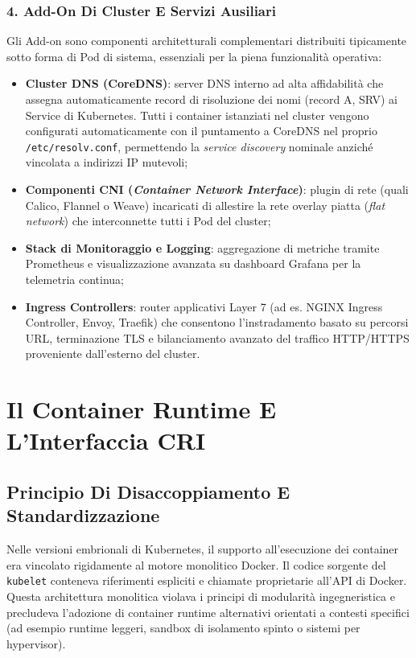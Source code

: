 \documentclass[11pt, a4paper]{article}
\begin{document}
\subsubsection{4. Add-On Di Cluster E Servizi Ausiliari}
Gli Add-on sono componenti architetturali complementari distribuiti tipicamente sotto forma di Pod di sistema, essenziali per la piena funzionalità operativa:
\begin{itemize}[noitemsep]
    \item \textbf{Cluster DNS (CoreDNS)}: server DNS interno ad alta affidabilità che assegna automaticamente record di risoluzione dei nomi (record A, SRV) ai Service di Kubernetes. Tutti i container istanziati nel cluster vengono configurati automaticamente con il puntamento a CoreDNS nel proprio \texttt{/etc/resolv.conf}, permettendo la \emph{service discovery} nominale anziché vincolata a indirizzi IP mutevoli;
    \item \textbf{Componenti CNI (\emph{Container Network Interface})}: plugin di rete (quali Calico, Flannel o Weave) incaricati di allestire la rete overlay piatta (\emph{flat network}) che interconnette tutti i Pod del cluster;
    \item \textbf{Stack di Monitoraggio e Logging}: aggregazione di metriche tramite Prometheus e visualizzazione avanzata su dashboard Grafana per la telemetria continua;
    \item \textbf{Ingress Controllers}: router applicativi Layer 7 (ad es. NGINX Ingress Controller, Envoy, Traefik) che consentono l'instradamento basato su percorsi URL, terminazione TLS e bilanciamento avanzato del traffico HTTP/HTTPS proveniente dall'esterno del cluster.
\end{itemize}

\newpage


\section{Il Container Runtime E L'Interfaccia CRI}
\label{sec:cri}

\subsection{Principio Di Disaccoppiamento E Standardizzazione}
Nelle versioni embrionali di Kubernetes, il supporto all'esecuzione dei container era vincolato rigidamente al motore monolitico Docker. Il codice sorgente del \texttt{kubelet} conteneva riferimenti espliciti e chiamate proprietarie all'API di Docker. Questa architettura monolitica violava i principi di modularità ingegneristica e precludeva l'adozione di container runtime alternativi orientati a contesti specifici (ad esempio runtime leggeri, sandbox di isolamento spinto o sistemi per hypervisor).
\end{document}
